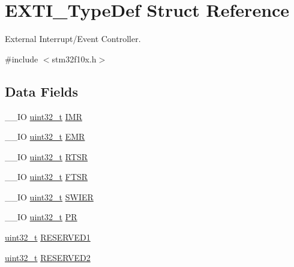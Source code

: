 \hypertarget{struct_e_x_t_i___type_def}{\section{E\-X\-T\-I\-\_\-\-Type\-Def Struct Reference}
\label{struct_e_x_t_i___type_def}
}


External Interrupt/\-Event Controller.  




{\ttfamily \#include $<$stm32f10x.\-h$>$}

\subsection*{Data Fields}
\begin{DoxyCompactItemize}
\item 
\-\_\-\-\_\-\-I\-O \hyperlink{stdint_8h_a435d1572bf3f880d55459d9805097f62}{uint32\-\_\-t} \hyperlink{struct_e_x_t_i___type_def_a17d061db586d4a5aa646b68495a8e6a4}{I\-M\-R}
\item 
\-\_\-\-\_\-\-I\-O \hyperlink{stdint_8h_a435d1572bf3f880d55459d9805097f62}{uint32\-\_\-t} \hyperlink{struct_e_x_t_i___type_def_a9c5bff67bf9499933959df7eb91a1bd6}{E\-M\-R}
\item 
\-\_\-\-\_\-\-I\-O \hyperlink{stdint_8h_a435d1572bf3f880d55459d9805097f62}{uint32\-\_\-t} \hyperlink{struct_e_x_t_i___type_def_ac019d211d8c880b327a1b90a06cc0675}{R\-T\-S\-R}
\item 
\-\_\-\-\_\-\-I\-O \hyperlink{stdint_8h_a435d1572bf3f880d55459d9805097f62}{uint32\-\_\-t} \hyperlink{struct_e_x_t_i___type_def_aee667dc148250bbf37fdc66dc4a9874d}{F\-T\-S\-R}
\item 
\-\_\-\-\_\-\-I\-O \hyperlink{stdint_8h_a435d1572bf3f880d55459d9805097f62}{uint32\-\_\-t} \hyperlink{struct_e_x_t_i___type_def_a5c1f538e64ee90918cd158b808f5d4de}{S\-W\-I\-E\-R}
\item 
\-\_\-\-\_\-\-I\-O \hyperlink{stdint_8h_a435d1572bf3f880d55459d9805097f62}{uint32\-\_\-t} \hyperlink{struct_e_x_t_i___type_def_a133294b87dbe6a01e8d9584338abc39a}{P\-R}
\item 
\hyperlink{stdint_8h_a435d1572bf3f880d55459d9805097f62}{uint32\-\_\-t} \hyperlink{struct_e_x_t_i___type_def_a022f7a6ab98b1cf66443e0af882122ef}{R\-E\-S\-E\-R\-V\-E\-D1}
\item 
\hyperlink{stdint_8h_a435d1572bf3f880d55459d9805097f62}{uint32\-\_\-t} \hyperlink{struct_e_x_t_i___type_def_ae89cc25b732d7992ed136ee137ddd7d4}{R\-E\-S\-E\-R\-V\-E\-D2}

\end{DoxyCompactItemize}
